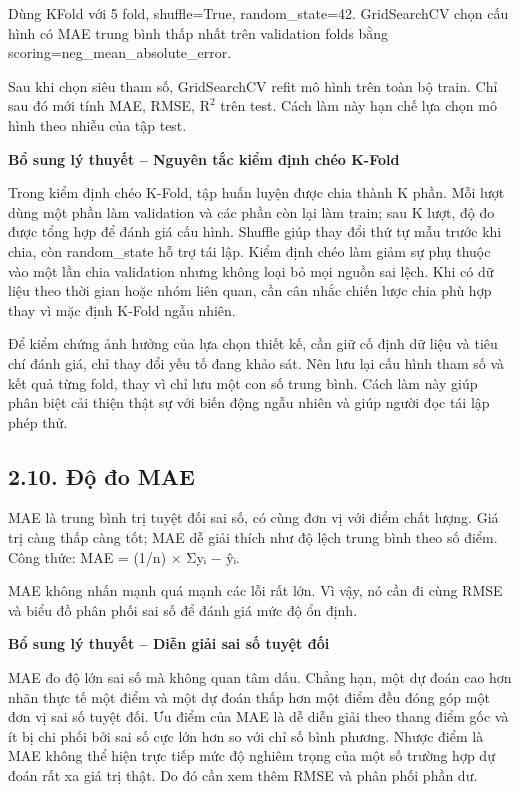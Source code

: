 \documentclass[12pt,a4paper,oneside]{article}
\begin{document}
Dùng KFold với 5 fold, shuffle=True, random\_state=42. GridSearchCV chọn
cấu hình có MAE trung bình thấp nhất trên validation folds bằng
scoring=neg\_mean\_absolute\_error.

Sau khi chọn siêu tham số, GridSearchCV refit mô hình trên toàn bộ
train. Chỉ sau đó mới tính MAE, RMSE, \(\text{R}^{\text{2}}\) trên test.
Cách làm này hạn chế lựa chọn mô hình theo nhiễu của tập test.


\par\noindent\textbf{Bổ sung lý thuyết -- Nguyên tắc kiểm định chéo K-Fold}\par
Trong kiểm định chéo K-Fold, tập huấn luyện được chia thành K phần. Mỗi lượt dùng một phần làm validation và các phần còn lại làm train; sau K lượt, độ đo được tổng hợp để đánh giá cấu hình. Shuffle giúp thay đổi thứ tự mẫu trước khi chia, còn random\_state hỗ trợ tái lập. Kiểm định chéo làm giảm sự phụ thuộc vào một lần chia validation nhưng không loại bỏ mọi nguồn sai lệch. Khi có dữ liệu theo thời gian hoặc nhóm liên quan, cần cân nhắc chiến lược chia phù hợp thay vì mặc định K-Fold ngẫu nhiên.\par

Để kiểm chứng ảnh hưởng của lựa chọn thiết kế, cần giữ cố định dữ liệu và tiêu chí đánh giá, chỉ thay đổi yếu tố đang khảo sát. Nên lưu lại cấu hình tham số và kết quả từng fold, thay vì chỉ lưu một con số trung bình. Cách làm này giúp phân biệt cải thiện thật sự với biến động ngẫu nhiên và giúp người đọc tái lập phép thử.\par

\subsection*{2.10. Độ đo MAE}

MAE là trung bình trị tuyệt đối sai số, có cùng đơn vị với điểm chất
lượng. Giá trị càng thấp càng tốt; MAE dễ giải thích như độ lệch trung
bình theo số điểm. Công thức: MAE = (1/n) × Σ\textbar yᵢ − ŷᵢ\textbar.

MAE không nhấn mạnh quá mạnh các lỗi rất lớn. Vì vậy, nó cần đi cùng
RMSE và biểu đồ phân phối sai số để đánh giá mức độ ổn định.


\par\noindent\textbf{Bổ sung lý thuyết -- Diễn giải sai số tuyệt đối}\par
MAE đo độ lớn sai số mà không quan tâm dấu. Chẳng hạn, một dự đoán cao hơn nhãn thực tế một điểm và một dự đoán thấp hơn một điểm đều đóng góp một đơn vị sai số tuyệt đối. Ưu điểm của MAE là dễ diễn giải theo thang điểm gốc và ít bị chi phối bởi sai số cực lớn hơn so với chỉ số bình phương. Nhược điểm là MAE không thể hiện trực tiếp mức độ nghiêm trọng của một số trường hợp dự đoán rất xa giá trị thật. Do đó cần xem thêm RMSE và phân phối phần dư.\par
\end{document}
